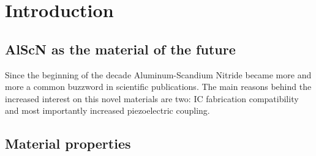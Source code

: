 \cleardoublepage
\chapter*{Introduction}

\section{AlScN as the material of the future}
Since the beginning of the decade Aluminum-Scandium Nitride became more and more a common buzzword in scientific publications. The main reasons behind the increased interest on this novel materials are two: IC fabrication compatibility and most importantly increased piezoelectric coupling. 


\section{Material properties }
